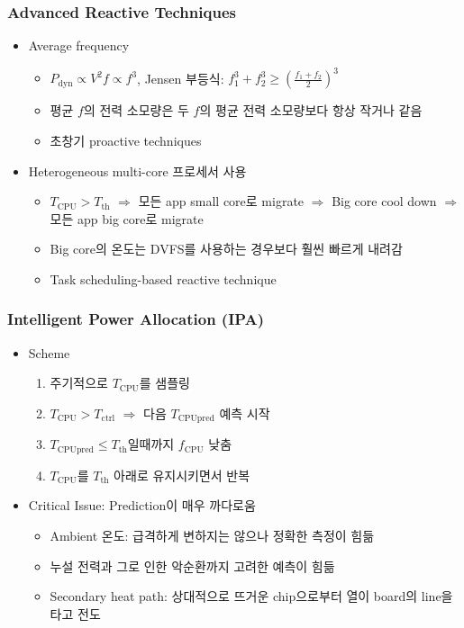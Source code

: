 \subsubsection*{Advanced Reactive Techniques}
\begin{itemize}
    \item Average frequency
    \begin{itemize}
        \item $P_\mathrm{dyn}\varpropto V^2f\varpropto f^3$, Jensen 부등식: $f_1^3 + f_2^3 \geq \left(\frac{f_1+f_2}{2}\right)^3$
        \item 평균 $f$의 전력 소모량은 두 $f$의 평균 전력 소모량보다 항상 작거나 같음
        \item 초창기 proactive techniques
    \end{itemize}
    \newpage
    \item Heterogeneous multi-core 프로세서 사용
    \begin{itemize}
        \item $T_\mathrm{CPU} > T_\mathrm{th}$ $\Rightarrow$ 모든 app small core로 migrate $\Rightarrow$ Big core cool down $\Rightarrow$ 모든 app big core로 migrate
        \item Big core의 온도는 DVFS를 사용하는 경우보다 훨씬 빠르게 내려감
        \item Task scheduling-based reactive technique
    \end{itemize}
\end{itemize}

\subsubsection*{Intelligent Power Allocation (IPA)}
\begin{itemize}
    \item Scheme
    \begin{enumerate}
        \item 주기적으로 $T_\mathrm{CPU}$를 샘플링
        \item $T_\mathrm{CPU} > T_\mathrm{ctrl}$ $\Rightarrow$ 다음 $T_\mathrm{CPUpred}$ 예측 시작
        \item $T_\mathrm{CPUpred}\leq T_\mathrm{th}$일때까지 $f_\mathrm{CPU}$ 낮춤
        \item $T_\mathrm{CPU}$를 $T_\mathrm{th}$ 아래로 유지시키면서 반복
    \end{enumerate}
    \item Critical Issue: Prediction이 매우 까다로움
    \begin{itemize}
        \item Ambient 온도: 급격하게 변하지는 않으나 정확한 측정이 힘듦
        \item 누설 전력과 그로 인한 악순환까지 고려한 예측이 힘듦
        \item Secondary heat path: 상대적으로 뜨거운 chip으로부터 열이 board의 line을 타고 전도
    \end{itemize}
\end{itemize}


